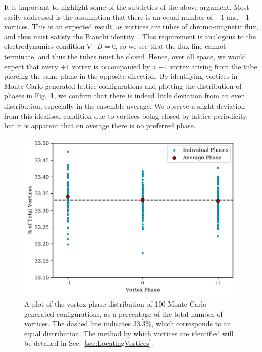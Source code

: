 It is important to highlight some of the subtleties of the above argument. Most easily addressed is the assumption that there is an equal number of $+1$ and $-1$ vortices. This is an expected result, as vortices are tubes of chromo-magnetic flux, and thus must satisfy the Bianchi identity~\cite{Engelhardt:2003wm}. This requirement is analogous to the electrodynamics condition $\nabla \cdot B = 0$, so we see that the flux line cannot terminate, and thus the tubes must be closed. Hence, over all space, we would expect that every $+1$ vortex is accompanied by a $-1$ vortex arising from the tube piercing the same plane in the opposite direction. By identifying vortices in Monte-Carlo generated lattice configurations and plotting the distribution of phases in Fig.~\ref{fig:VortexDistribution}, we confirm that there is indeed little deviation from an even distribution, especially in the ensemble average. We observe a slight deviation from this idealised condition due to vortices being closed by lattice periodicity, but it is apparent that on average there is no preferred phase.\\
%
\begin{figure}[htb!]
\includegraphics[width=0.9\linewidth]{./VortexDistribution.pdf}
\caption[A plot of the vortex phase distribution of 100 Monte-Carlo generated configurations.]{\label{fig:VortexDistribution}A plot of the vortex phase distribution of 100 Monte-Carlo generated configurations, as a percentage of the total number of vortices. The dashed line indicates $33.\dot{3}\%$, which corresponds to an equal distribution. The method by which vortices are identified will be detailed in Sec.~\ref{sec:LocatingVortices}.}
\end{figure}
%

